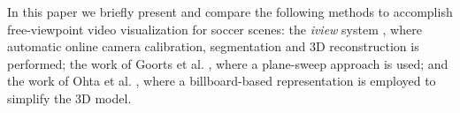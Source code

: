 
In this paper we briefly present and compare the following methods to accomplish free-viewpoint video 
visualization for soccer scenes: the \textit{iview} system \cite{02_iview}, where automatic online camera calibration, 
segmentation and 3D reconstruction is performed;
the work of Goorts et al. \cite{05_plane_sweeping}, where a plane-sweep approach is used; 
and the work of Ohta et al. \cite{03_billboard}, where a billboard-based representation is employed to simplify the 
3D model.



